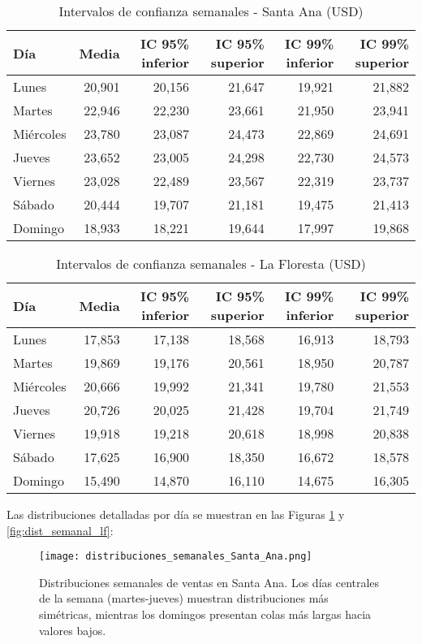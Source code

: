 \documentclass[12pt]{article}
\begin{document}
\begin{table}[H]
\centering
\caption{Intervalos de confianza semanales - Santa Ana (USD)}
\begin{tabular}{lrrrrr}
\toprule
Día & Media & IC 95\% inferior & IC 95\% superior & IC 99\% inferior & IC 99\% superior \\
\midrule
Lunes & 20,901 & 20,156 & 21,647 & 19,921 & 21,882 \\
Martes & 22,946 & 22,230 & 23,661 & 21,950 & 23,941 \\
Miércoles & 23,780 & 23,087 & 24,473 & 22,869 & 24,691 \\
Jueves & 23,652 & 23,005 & 24,298 & 22,730 & 24,573 \\
Viernes & 23,028 & 22,489 & 23,567 & 22,319 & 23,737 \\
Sábado & 20,444 & 19,707 & 21,181 & 19,475 & 21,413 \\
Domingo & 18,933 & 18,221 & 19,644 & 17,997 & 19,868 \\
\bottomrule
\end{tabular}
\end{table}

\begin{table}[H]
\centering
\caption{Intervalos de confianza semanales - La Floresta (USD)}
\begin{tabular}{lrrrrr}
\toprule
Día & Media & IC 95\% inferior & IC 95\% superior & IC 99\% inferior & IC 99\% superior \\
\midrule
Lunes & 17,853 & 17,138 & 18,568 & 16,913 & 18,793 \\
Martes & 19,869 & 19,176 & 20,561 & 18,950 & 20,787 \\
Miércoles & 20,666 & 19,992 & 21,341 & 19,780 & 21,553 \\
Jueves & 20,726 & 20,025 & 21,428 & 19,704 & 21,749 \\
Viernes & 19,918 & 19,218 & 20,618 & 18,998 & 20,838 \\
Sábado & 17,625 & 16,900 & 18,350 & 16,672 & 18,578 \\
Domingo & 15,490 & 14,870 & 16,110 & 14,675 & 16,305 \\
\bottomrule
\end{tabular}
\end{table}

Las distribuciones detalladas por día se muestran en las Figuras \ref{fig:dist_semanal_sa} y \ref{fig:dist_semanal_lf}:

\begin{figure}[H]
\centering
\texttt{[image: distribuciones\_semanales\_Santa\_Ana.png]}
\caption{Distribuciones semanales de ventas en Santa Ana. Los días centrales de la semana (martes-jueves) muestran distribuciones más simétricas, mientras los domingos presentan colas más largas hacia valores bajos.}
\label{fig:dist_semanal_sa}
\end{figure}
\end{document}
